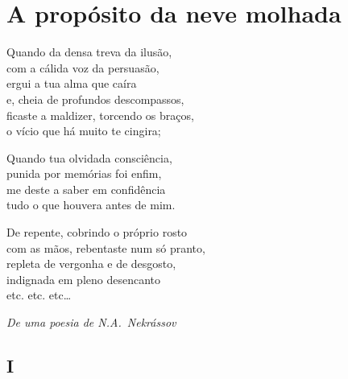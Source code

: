 \chapter{A propósito da neve molhada}

\epigraph{%
Quando da densa treva da ilusão,\\
com a cálida voz da persuasão,\\
ergui a tua alma que caíra\\
e, cheia de profundos descompassos,\\
ficaste a maldizer, torcendo os braços,\\
o vício que há muito te cingira;

Quando tua olvidada consciência,\\
punida por memórias foi enfim,\\
me deste a saber em confidência\\
tudo o que houvera antes de mim.

De repente, cobrindo o próprio rosto\\
com as mãos, rebentaste num só pranto,\\
repleta de vergonha e de desgosto,\\
indignada em pleno desencanto\\
etc. etc. etc\ldots{}}{\textit{De uma poesia de N.A.~Nekrássov}\footnotemark}

\medskip

\section{I}

